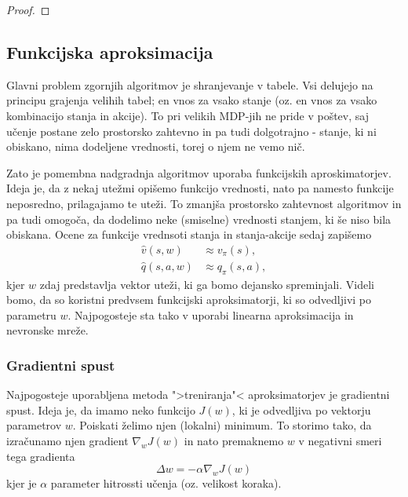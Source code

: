 \documentclass[12pt,a4paper]{amsart}
\theoremstyle{definition} %
\theoremstyle{plain} %
\begin{document}
\begin{proof}
    
\end{proof}

\subsection{Funkcijska aproksimacija}
Glavni problem zgornjih algoritmov je shranjevanje v tabele. Vsi delujejo na principu grajenja 
velihih tabel; en vnos za vsako stanje (oz. en vnos za vsako kombinacijo stanja in akcije). To pri 
velikih MDP-jih ne pride v poštev, saj učenje postane zelo prostorsko zahtevno in pa tudi 
dolgotrajno - stanje, ki ni obiskano, nima dodeljene vrednosti, torej o njem ne vemo nič. 

Zato je pomembna nadgradnja algoritmov uporaba funkcijskih aproskimatorjev. Ideja je, da z nekaj 
utežmi opišemo funkcijo vrednosti, nato pa namesto funkcije neposredno, prilagajamo te uteži. To 
zmanjša prostorsko zahtevnost algoritmov in pa tudi omogoča, da dodelimo neke (smiselne) vrednosti
stanjem, ki še niso bila obiskana. Ocene za funkcije vrednsoti stanja in stanja-akcije sedaj 
zapišemo
\begin{align*}
    \hat{v}(s, w) &\approx v_\pi(s), \\
    \hat{q}(s, a, w) &\approx q_\pi(s, a), 
\end{align*}
kjer $w$ zdaj predstavlja vektor uteži, ki ga bomo dejansko spreminjali. Videli bomo, da so koristni
predvsem funkcijski aproksimatorji, ki so odvedljivi po parametru $w$. Najpogosteje sta tako v 
uporabi linearna aproksimacija in nevronske mreže. 


\subsubsection{Gradientni spust}
Najpogosteje uporabljena metoda ">treniranja"< aproksimatorjev je gradientni spust. Ideja je, da 
imamo neko funkcijo $J(w)$, ki je odvedljiva po vektorju parametrov $w$. Poiskati želimo njen 
(lokalni) minimum. To storimo tako, da izračunamo njen gradient $\nabla_wJ(w)$ in nato premaknemo $w$
v negativni smeri tega gradienta
$$
\Delta w = - \alpha \nabla_wJ(w)
$$
kjer je $\alpha$ parameter hitrossti učenja (oz. velikost koraka). 
\end{document}
